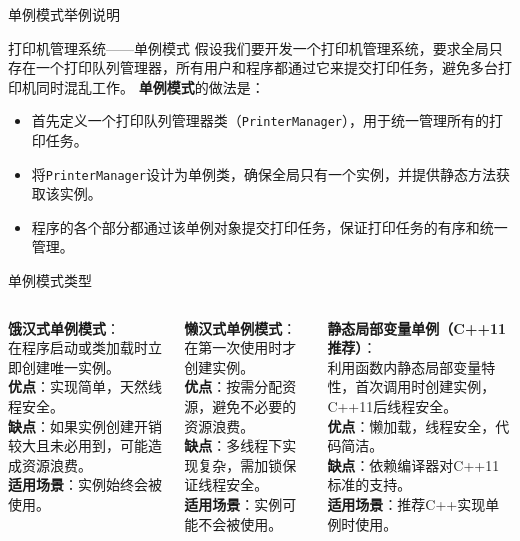 \documentclass[UTF8,aspectratio=169]{beamer}
\begin{document}
\begin{frame}{单例模式举例说明}
    \begin{exampleytublock}{打印机管理系统——单例模式}
        假设我们要开发一个打印机管理系统，要求全局只存在一个打印队列管理器，所有用户和程序都通过它来提交打印任务，避免多台打印机同时混乱工作。
        \textbf{单例模式}的做法是：
        \begin{itemize}
            \item 首先定义一个打印队列管理器类（\texttt{PrinterManager}），用于统一管理所有的打印任务。
            \item 将\texttt{PrinterManager}设计为单例类，确保全局只有一个实例，并提供静态方法获取该实例。
            \item 程序的各个部分都通过该单例对象提交打印任务，保证打印任务的有序和统一管理。
        \end{itemize}
    \end{exampleytublock}
\end{frame}

\begin{frame}{单例模式类型}
    \begin{columns}
        \begin{column}{0.32\textwidth}
            \textbf{饿汉式单例模式}：\\
            在程序启动或类加载时立即创建唯一实例。\\
            \textbf{优点}：实现简单，天然线程安全。\\
            \textbf{缺点}：如果实例创建开销较大且未必用到，可能造成资源浪费。\\
            \textbf{适用场景}：实例始终会被使用。
        \end{column}
        \begin{column}{0.32\textwidth}
            \textbf{懒汉式单例模式}：\\
            在第一次使用时才创建实例。\\
            \textbf{优点}：按需分配资源，避免不必要的资源浪费。\\
            \textbf{缺点}：多线程下实现复杂，需加锁保证线程安全。\\
            \textbf{适用场景}：实例可能不会被使用。
        \end{column}
        \begin{column}{0.32\textwidth}
            \textbf{静态局部变量单例（C++11推荐）}：\\
            利用函数内静态局部变量特性，首次调用时创建实例，C++11后线程安全。\\
            \textbf{优点}：懒加载，线程安全，代码简洁。\\
            \textbf{缺点}：依赖编译器对C++11标准的支持。\\
            \textbf{适用场景}：推荐C++实现单例时使用。
        \end{column}
    \end{columns}
\end{frame}
\end{document}
